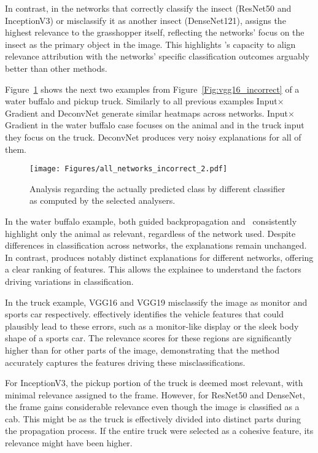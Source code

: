 In contrast, in the networks that correctly classify the insect (ResNet50 and InceptionV3) or misclassify it as another insect (DenseNet121), \CTC\/ assigns the highest relevance to the grasshopper itself, reflecting the networks’ focus on the insect as the primary object in the image. This highlights \CTC\/’s capacity to align relevance attribution with the networks’ specific classification outcomes arguably better than other methods.

Figure~\ref{Fig:compare_models_same_missclassified_2} shows the next two examples from Figure~\ref{Fig:vgg16_incorrect} of a water buffalo and pickup truck. Similarly to all previous examples Input$\times$Gradient and DeconvNet generate similar heatmaps across networks. Input$\times$Gradient in the water buffalo case focuses on the animal and in the truck input they focus on the truck. DeconvNet produces very noisy explanations for all of them. 

\begin{figure}[ht!]
	\begin{center}
		\texttt{[image: Figures/all\_networks\_incorrect\_2.pdf]}
	\end{center}
	\caption{Analysis regarding the actually predicted class by different classifier as computed by the selected analysers.}
	\label{Fig:compare_models_same_missclassified_2}
\end{figure} 

In the water buffalo example, both guided backpropagation and \LRP\ consistently highlight only the animal as relevant, regardless of the network used. Despite differences in classification across networks, the explanations remain unchanged. In contrast, \CTC\/ produces notably distinct explanations for different networks, offering a clear ranking of features. This allows the explainee to understand the factors driving variations in classification.

In the truck example, VGG16 and VGG19 misclassify the image as monitor and sports car respectively. \CTC\/ effectively identifies the vehicle features that could plausibly lead to these errors, such as a monitor-like display or the sleek body shape of a sports car. The relevance scores for these regions are significantly higher than for other parts of the image, demonstrating that the method accurately captures the features driving these misclassifications.

For InceptionV3, the pickup portion of the truck is deemed most relevant, with minimal relevance assigned to the frame. However, for ResNet50 and DenseNet, the frame gains considerable relevance even though the image is classified as a cab. This might be as  the truck is effectively divided into distinct parts during the propagation process. If the entire truck were selected as a cohesive feature, its relevance might have been higher.

